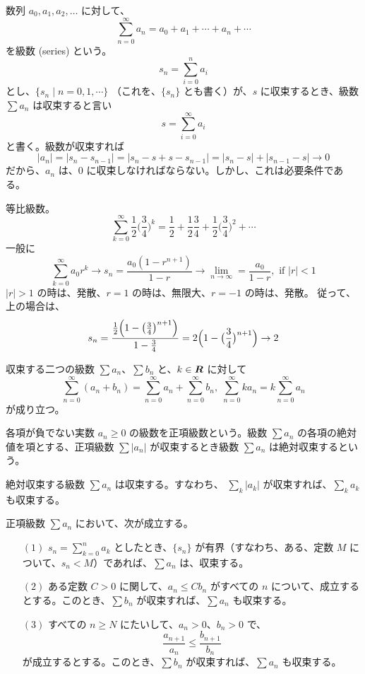 数列 $a_0, a_1, a_2, \ldots$ に対して、
$$\sum_{n=0}^\infty a_n = a_0 + a_1 + \cdots + a_n + \cdots$$
を級数 (series) という。
$$s_n = \sum_{i = 0}^n a_i$$
とし、$\{s_n\mid n = 0, 1, \cdots \}$ （これを、$\{s_n\}$ とも書く）が、$s$ に収束するとき、級数 $\sum a_n$ は収束すると言い
$$s = \sum_{i = 0}^\infty a_i$$
と書く。級数が収束すれば 
$$|a_n| = |s_n - s_{n-1}| = |s_n - s + s - s_{n-1}| = |s_n-s| + |s_{n-1} - s| \to 0$$ 
だから、$a_n$ は、$0$ に収束しなければならない。しかし、これは必要条件である。

\begin{eg}
等比級数。
$$\sum_{k=0}^\infty \frac12\bigl(\frac34\bigr)^k = \frac12 + \frac12\frac34 + 
\frac12\bigl(\frac34\bigr)^2 + \cdots $$
一般に
$$\sum_{k=0}^\infty a_0 r^k \to s_n = \frac{a_0(1-r^{n+1})}{1-r} \to \lim_{n\to \infty} = \frac{a_0}{1-r},\mbox{ if } |r|<1$$
$|r| > 1$ の時は、発散、$r = 1$ の時は、無限大、$r = -1$ の時は、発散。
従って、上の場合は、
$$s_n = \frac{\frac12\Bigl(1 - \bigl(\frac34\bigr)^{n+1}\Bigr)}{1-\frac34} = 2\Bigl(1 - \bigl(\frac34\bigr)^{n+1}\Bigr) \to 2$$
\end{eg}

収束する二つの級数 $\sum a_n$、$\sum b_n$ と、$k\in \mbox{\boldmath $R$}$ に対して
$$\sum_{n=0}^\infty(a_n + b_n) = \sum_{n=0}^\infty a_n + \sum_{n=0}^\infty b_n,\;\sum_{n=0}^\infty ka_n = k\sum_{n=0}^\infty a_n$$
が成り立つ。

\begin{definition}
各項が負でない実数 $a_n\geq 0$ の級数を正項級数という。級数 $\sum a_n$ の各項の絶対値を項とする、正項級数 $\sum |a_n|$ が収束するとき級数 $\sum a_n$ は絶対収束するという。
\end{definition}

\begin{thm} \label{thm:abs-conv}
絶対収束する級数 $\sum a_n$ は収束する。すなわち、
$\sum_k |a_k|$ が収束すれば、$\sum_k a_k$ も収束する。
\end{thm}

\begin{thm} \label{thm:conv:cond}
正項級数 $\sum a_n$ において、次が成立する。
\begin{itemize}
\item[$(1)$] ${\displaystyle s_n = \sum_{k=0}^n a_k}$ としたとき、$\{s_n\}$ が有界（すなわち、ある、定数 $M$ について、$s_n < M$）であれば、$\sum a_n$ は、収束する。
\item[$(2)$] ある定数 $C>0$ に関して、$a_n \leq Cb_n$ がすべての $n$ について、成立するとする。このとき、$\sum b_n$ が収束すれば、$\sum a_n$ も収束する。
\item[$(3)$] すべての $n\geq N$ にたいして、$a_n > 0$、$b_n>0$ で、
$$\frac{a_{n+1}}{a_n} \leq \frac{b_{n+1}}{b_n}$$
が成立するとする。このとき、$\sum b_n$ が収束すれば、$\sum a_n$ も収束する。
\end{itemize}
\end{thm}

